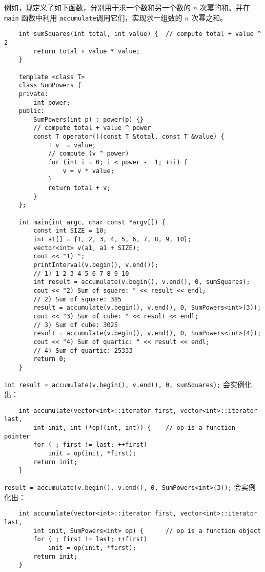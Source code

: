 \documentclass[UTF8]{ctexart}
\begin{document}
例如，现定义了如下函数，分别用于求一个数和另一个数的 $n$ 次幂的和。并在 \texttt{main} 函数中利用
\texttt{accumulate}调用它们，实现求一组数的 $n$ 次幂之和。
\begin{verbatim}
    int sumSquares(int total, int value) {  // compute total + value ^ 2
        return total + value * value;
    }

    template <class T>
    class SumPowers {
    private:
        int power;
    public:
        SumPowers(int p) : power(p) {}
        // compute total + value ^ power
        const T operator()(const T &total, const T &value) {
            T v  = value;
            // compute (v ^ power)
            for (int i = 0; i < power -  1; ++i) {
                v = v * value;
            }
            return total + v;
        }
    };

    int main(int argc, char const *argv[]) {
        const int SIZE = 10;
        int a1[] = {1, 2, 3, 4, 5, 6, 7, 8, 9, 10};
        vector<int> v(a1, a1 + SIZE);
        cout << "1) ";
        printInterval(v.begin(), v.end());
        // 1) 1 2 3 4 5 6 7 8 9 10
        int result = accumulate(v.begin(), v.end(), 0, sumSquares);
        cout << "2) Sum of square: " << result << endl;
        // 2) Sum of square: 385
        result = accumulate(v.begin(), v.end(), 0, SumPowers<int>(3));
        cout << "3) Sum of cube: " << result << endl;
        // 3) Sum of cube: 3025
        result = accumulate(v.begin(), v.end(), 0, SumPowers<int>(4));
        cout << "4) Sum of quartic: " << result << endl;
        // 4) Sum of quartic: 25333
        return 0;
    }
\end{verbatim}

\texttt{int result = accumulate(v.begin(), v.end(), 0, sumSquares);} 会实例化出：
\begin{verbatim}
    int accumulate(vector<int>::iterator first, vector<int>::iterator last,
        int init, int (*op)(int, int)) {    // op is a function pointer
        for ( ; first != last; ++first)
            init = op(init, *first);
        return init;
    }
\end{verbatim}

\texttt{result = accumulate(v.begin(), v.end(), 0, SumPowers<int>(3));} 会实例化出：
\begin{verbatim}
    int accumulate(vector<int>::iterator first, vector<int>::iterator last,
        int init, SumPowers<int> op) {      // op is a function object
        for ( ; first != last; ++first)
            init = op(init, *first);
        return init;
    }
\end{verbatim}
\end{document}
